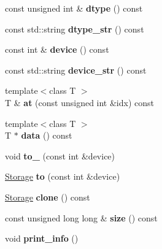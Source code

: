 \begin{DoxyCompactItemize}
const unsigned int \& {\bfseries dtype} () const
\item 
\mbox{\label{classcytnx_1_1Storage_ab6e9fb01ad4655701a2d54dc978eef17}} 
const std\+::string {\bfseries dtype\+\_\+str} () const
\item 
\mbox{\label{classcytnx_1_1Storage_a4c3e27582d7f951e6b76ccbb92f7c537}} 
const int \& {\bfseries device} () const
\item 
\mbox{\label{classcytnx_1_1Storage_ae0d90d5275fa7e52a0a2dc10512ba71f}} 
const std\+::string {\bfseries device\+\_\+str} () const
\item 
\mbox{\label{classcytnx_1_1Storage_acf07db8f07fcc723e41718f604959c5b}} 
{\footnotesize template$<$class T $>$ }\\T \& {\bfseries at} (const unsigned int \&idx) const
\item 
\mbox{\label{classcytnx_1_1Storage_af37d781719238ae66509ff145e5b1bd7}} 
{\footnotesize template$<$class T $>$ }\\T $\ast$ {\bfseries data} () const
\item 
\mbox{\label{classcytnx_1_1Storage_a0bbf2cbefb5d0835bcb4f0d05e400870}} 
void {\bfseries to\+\_\+} (const int \&device)
\item 
\mbox{\label{classcytnx_1_1Storage_a2abfcaacf807934be5dd21c254fdb30e}} 
\hyperlink{classcytnx_1_1Storage}{Storage} {\bfseries to} (const int \&device)
\item 
\mbox{\label{classcytnx_1_1Storage_aed0530dd20f3fb352d45653ba46a3d50}} 
\hyperlink{classcytnx_1_1Storage}{Storage} {\bfseries clone} () const
\item 
\mbox{\label{classcytnx_1_1Storage_aaf36262622abdab03c90b713c454f78e}} 
const unsigned long long \& {\bfseries size} () const
\item 
\mbox{\label{classcytnx_1_1Storage_a0ae2bee5e15c651b05dadf5dbbdb36f5}} 
void {\bfseries print\+\_\+info} ()

\end{DoxyCompactItemize}

